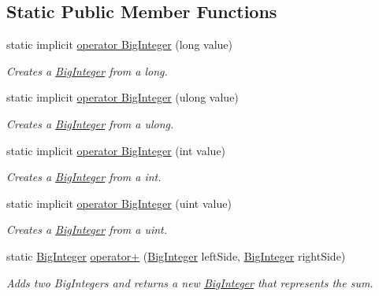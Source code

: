 \subsection*{Static Public Member Functions}
\begin{DoxyCompactItemize}
\item 
static implicit \hyperlink{class_scott_garland_1_1_big_integer_ab7ca7bc80abdb8236d2a02468c7025ec}{operator Big\+Integer} (long value)
\begin{DoxyCompactList}\small\item\em Creates a \hyperlink{class_scott_garland_1_1_big_integer}{Big\+Integer} from a long. \end{DoxyCompactList}\item 
static implicit \hyperlink{class_scott_garland_1_1_big_integer_a969d60de29a3f809ea166e6bd1c77302}{operator Big\+Integer} (ulong value)
\begin{DoxyCompactList}\small\item\em Creates a \hyperlink{class_scott_garland_1_1_big_integer}{Big\+Integer} from a ulong. \end{DoxyCompactList}\item 
static implicit \hyperlink{class_scott_garland_1_1_big_integer_a3a17f77a3e90cf657d105559ad35fecf}{operator Big\+Integer} (int value)
\begin{DoxyCompactList}\small\item\em Creates a \hyperlink{class_scott_garland_1_1_big_integer}{Big\+Integer} from a int. \end{DoxyCompactList}\item 
static implicit \hyperlink{class_scott_garland_1_1_big_integer_a4058c6d81e843425ed6b1ceb98706abe}{operator Big\+Integer} (uint value)
\begin{DoxyCompactList}\small\item\em Creates a \hyperlink{class_scott_garland_1_1_big_integer}{Big\+Integer} from a uint. \end{DoxyCompactList}\item 
static \hyperlink{class_scott_garland_1_1_big_integer}{Big\+Integer} \hyperlink{class_scott_garland_1_1_big_integer_aa0f043b20ba83229df2817492330c966}{operator+} (\hyperlink{class_scott_garland_1_1_big_integer}{Big\+Integer} left\+Side, \hyperlink{class_scott_garland_1_1_big_integer}{Big\+Integer} right\+Side)
\begin{DoxyCompactList}\small\item\em Adds two Big\+Integers and returns a new \hyperlink{class_scott_garland_1_1_big_integer}{Big\+Integer} that represents the sum. \end{DoxyCompactList}\item 

\end{DoxyCompactItemize}
